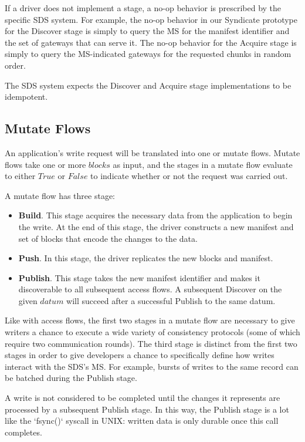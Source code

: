 If a driver does not implement a stage, a no-op behavior is prescribed by the
specific SDS system.  For example, the no-op behavior in our Syndicate prototype for the
Discover stage is simply to query the MS for the manifest identifier and the 
set of gateways that can serve it.  The no-op behavior for the Acquire
stage is simply to query the MS-indicated gateways for the requested chunks
in random order.

The SDS system expects the Discover and Acquire stage implementations to be
idempotent.

\subsection{Mutate Flows}

An application's write request will be translated into one or mutate flows.
Mutate flows take one or more $blocks$ as input, and the stages in a mutate flow
evaluate to either $True$ or $False$ to indicate whether or not the request was
carried out.

A mutate flow has three stage:

\begin{itemize}
    \item \textbf{Build}.  This stage acquires the necessary data from the
application to begin the write.  At the end of this stage, the driver constructs
a new manifest and set of blocks that encode the changes to the data. 
    \item \textbf{Push}.  In this stage, the driver replicates the new blocks and
manifest.
    \item \textbf{Publish}.  This stage takes the new manifest identifier and makes
it discoverable to all subsequent access flows.  A subsequent Discover on the
given $datum$ will succeed after a successful Publish to the same datum.
\end{itemize}

Like with access flows, the first two stages in a mutate flow are necessary to give writers a
chance to execute a wide variety of consistency protocols (some of which require
two communication rounds).  The third stage is distinct from the first two stages
in order to give developers a chance to specifically define how writes
interact with the SDS's MS.  For example, bursts of writes to the same record
can be batched during the Publish stage.

A write is not considered to be completed until the changes it represents are
processed by a subsequent Publish stage.  In this way, the Publish stage is a lot
like the `fsync()` syscall in UNIX:  written data is only durable once this call
completes.

